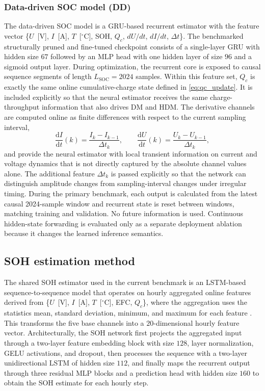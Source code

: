 \documentclass[review,nopreprintline]{elsarticle}
\begin{document}
\subsubsection{Data-driven SOC model (DD)}
The data-driven SOC model is a GRU-based recurrent estimator with the feature vector \{$U$~[V], $I$~[A], $T$~[$^\circ$C], SOH, $Q_c$, $dU/dt$, $dI/dt$, $\Delta t$\}. The benchmarked structurally pruned and fine-tuned checkpoint consists of a single-layer GRU with hidden size $67$ followed by an MLP head with one hidden layer of size $96$ and a sigmoid output layer. During optimization, the recurrent core is exposed to causal sequence segments of length $L_{\mathrm{SOC}}=2024$ samples. Within this feature set, $Q_c$ is exactly the same online cumulative-charge state defined in \eqref{eq:qc_update}. It is included explicitly so that the neural estimator receives the same charge-throughput information that also drives DM and HDM. The derivative channels are computed online as finite differences with respect to the current sampling interval,
\begin{equation}
    \frac{\mathrm{d}I}{\mathrm{d}t}(k)=\frac{I_k-I_{k-1}}{\Delta t_k},
    \qquad
    \frac{\mathrm{d}U}{\mathrm{d}t}(k)=\frac{U_k-U_{k-1}}{\Delta t_k},
    \label{eq:derivative_features}
\end{equation}
and provide the neural estimator with local transient information on current and voltage dynamics that is not directly captured by the absolute channel values alone. The additional feature $\Delta t_k$ is passed explicitly so that the network can distinguish amplitude changes from sampling-interval changes under irregular timing. During the primary benchmark, each output is calculated from the latest causal 2024-sample window and recurrent state is reset between windows, matching training and validation. No future information is used. Continuous hidden-state forwarding is evaluated only as a separate deployment ablation because it changes the learned inference semantics.

\subsection{SOH estimation method}
The shared SOH estimator used in the current benchmark is an LSTM-based sequence-to-sequence model that operates on hourly aggregated online features derived from \{$U$~[V], $I$~[A], $T$~[$^\circ$C], EFC, $Q_c$\}, where the aggregation uses the statistics mean, standard deviation, minimum, and maximum for each feature \cite{Embedded_AI_SOH_badData,gouEnsembleLearningBasedDataDriven2021,liOnlineCapacityEstimation2021,rzepkaNeuralNetworkArchitecture2023a}. This transforms the five base channels into a $20$-dimensional hourly feature vector. Architecturally, the SOH network first projects the aggregated input through a two-layer feature embedding block with size $128$, layer normalization, GELU activations, and dropout, then processes the sequence with a two-layer unidirectional LSTM of hidden size $112$, and finally maps the recurrent output through three residual MLP blocks and a prediction head with hidden size $160$ to obtain the SOH estimate for each hourly step.
\end{document}
